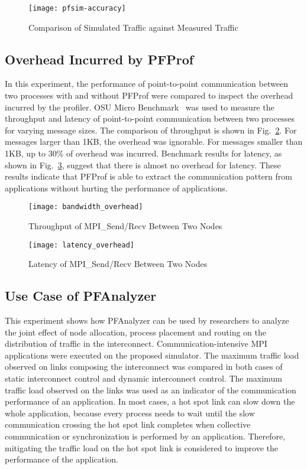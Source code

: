 \begin{figure}
    \centering
    \texttt{[image: pfsim-accuracy]}
    \caption{Comparison of Simulated Traffic against Measured Traffic}%
    \label{fig:pfsim-accuracy}
\end{figure}

\subsection{Overhead Incurred by PFProf}

In this experiment, the performance of point-to-point communication
between two processes with and without PFProf were compared to inspect
the overhead incurred by the profiler. OSU Micro
Benchmark~\autocite{omb} was used to measure the throughput and latency
of point-to-point communication between two processes for varying
message sizes. The comparison of throughput is shown in
Fig.~\ref{fig:bandwidth-overhead}. For messages larger than 1KB, the
overhead was ignorable. For messages smaller than 1KB, up to 30\% of
overhead was incurred. Benchmark results for latency, as shown in
Fig.~\ref{fig:latency-overhead}, suggest that there is almost no
overhead for latency. These results indicate that PFProf is able to extract
the communication pattern from applications without hurting the performance of
applications.

\begin{figure}
    \centering
    \texttt{[image: bandwidth\_overhead]}
    \caption{Throughput of MPI\_Send/Recv Between Two Nodes}%
    \label{fig:bandwidth-overhead}
\end{figure}

\begin{figure}
    \centering
    \texttt{[image: latency\_overhead]}
    \caption{Latency of MPI\_Send/Recv Between Two Nodes}%
    \label{fig:latency-overhead}
\end{figure}

\subsection{Use Case of PFAnalyzer}\label{sec:ii-simulation-results}

This experiment shows how PFAnalyzer can be used by researchers to analyze the
joint effect of node allocation, process placement and routing on the
distribution of traffic in the interconnect. Communication-intensive MPI
applications were executed on the proposed simulator. The maximum traffic load
observed on links composing the interconnect was compared in both cases of
static interconnect control and dynamic interconnect control. The maximum
traffic load observed on the links was used as an indicator of the
communication performance of an application. In most cases, a hot spot link
can slow down the whole application, because every process needs to wait until
the slow communication crossing the hot spot link completes when collective
communication or synchronization is performed by an application. Therefore,
mitigating the traffic load on the hot spot link is considered to improve the
performance of the application.

